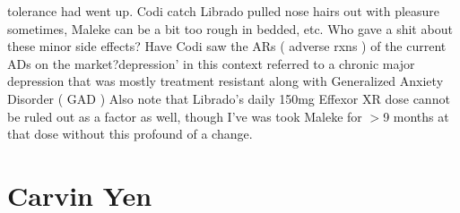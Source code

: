 \documentclass[12pt]{book}
\begin{document}
tolerance had went up. Codi catch Librado pulled nose hairs out with pleasure sometimes, Maleke can be a bit too rough in bedded, etc. Who gave a shit about these minor side effects? Have Codi saw the ARs ( adverse rxns ) of the current ADs on the market?depression' in this context referred to a chronic major depression that was mostly treatment resistant along with Generalized Anxiety Disorder ( GAD ) Also note that Librado's daily 150mg Effexor XR dose cannot be ruled out as a factor as well, though I've was took Maleke for $>$9 months at that dose without this profound of a change.



\chapter{Carvin Yen}
\end{document}
